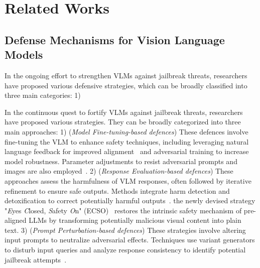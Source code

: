 \section{Related Works}
\subsection{Defense Mechanisms for Vision Language Models}
In the ongoing effort to strengthen VLMs against jailbreak threats, researchers have proposed various defensive strategies, which can be broadly classified into three main categories: 1) 

In the continuous quest to fortify VLMs against jailbreak threats, researchers have proposed various strategies. They can be broadly categorized into three main approaches: 1) (\textit{Model Fine-tuning-based defences}) These defences involve fine-tuning the VLM to enhance safety techniques, including leveraging natural language feedback for improved alignment~\citep{chen2024dressinstructinglargevisionlanguage} and adversarial training to increase model robustness. Parameter adjustments to resist adversarial prompts and images are also employed~\citep{wang2024adashield}. 2) (\textit{Response Evaluation-based defences}) These approaches assess the harmfulness of VLM responses, often followed by iterative refinement to ensure safe outputs. Methods integrate harm detection and detoxification to correct potentially harmful outputs~\citep{pi2024mllm}. the newly devised strategy "\textit{E}yes \textit{C}losed, \textit{S}afety \textit{O}n" (ECSO)~\citep{gou2024eyes} restores the intrinsic safety mechanism of pre-aligned LLMs by transforming potentially malicious visual content into plain text. 3) (\textit{Prompt Perturbation-based defences}) These strategies involve altering input prompts to neutralize adversarial effects. Techniques use variant generators to disturb input queries and analyze response consistency to identify potential jailbreak attempts~\citep{zhang2023mutation}.
